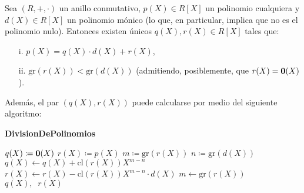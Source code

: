 \begin{proposition} \label{div_polinomios}
Sea $(R, +, \cdot)$ un anillo conmutativo, ${p(X) \in R[X]}$ un polinomio cualquiera y $d(X) \in R[X]$ un polinomio mónico (lo que, en particular, implica que no es el polinomio nulo). Entonces existen únicos $q(X), r(X) \in R[X]$ tales que:
\begin{itemize}
\item[i.] $p(X) = q(X) \cdot d(X) + r(X)$,
\item[ii.] $\mathrm{gr}(r(X)) < \mathrm{gr}(d(X))$ (admitiendo, posiblemente, que $r(X) = \mathbf{0}(X)$). 
\end{itemize}
Además, el par $(q(X), r(X))$ puede calcularse por medio del siguiente algoritmo:
\begin{algorithm}[H]
    \caption{\quad\textbf{DivisionDePolinomios}}
    \label{alg_division_polinomios}
    \begin{algorithmic}[1]
        \STATE $q(X) \coloneqq \mathbf{0}(X)$
        \STATE $r(X) \coloneqq p(X)$
        \STATE $m \coloneqq \mathrm{gr}(r(X))$
        \STATE $n \coloneqq \mathrm{gr}(d(X))$
            \STATE $q(X) \gets q(X) + \mathrm{cl}(r(X)) X^{m-n}$ 
            \STATE $r(X) \gets r(X) - \mathrm{cl}(r(X)) X^{m-n} \cdot d(X)$
            \STATE $m \gets \mathrm{gr}(r(X))$
        \ENDWHILE
        \RETURN $q(X),\;\; r(X)$
    \end{algorithmic}
    \end{algorithm}
\end{proposition}



